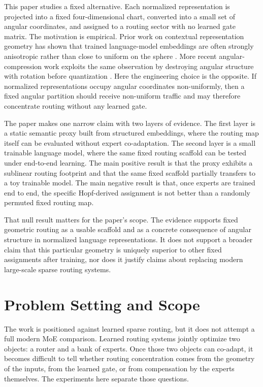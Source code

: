 \documentclass[11pt,letterpaper]{article}
\begin{document}
This paper studies a fixed alternative. Each normalized representation is projected into a fixed four-dimensional chart, converted into a small set of angular coordinates, and assigned to a routing sector with no learned gate matrix. The motivation is empirical. Prior work on contextual representation geometry has shown that trained language-model embeddings are often strongly anisotropic rather than close to uniform on the sphere \citep{ethayarajh2019anisotropy}. More recent angular-compression work exploits the same observation by destroying angular structure with rotation before quantization \citep{turboquant2026}. Here the engineering choice is the opposite. If normalized representations occupy angular coordinates non-uniformly, then a fixed angular partition should receive non-uniform traffic and may therefore concentrate routing without any learned gate.

The paper makes one narrow claim with two layers of evidence. The first layer is a static semantic proxy built from structured embeddings, where the routing map itself can be evaluated without expert co-adaptation. The second layer is a small trainable language model, where the same fixed routing scaffold can be tested under end-to-end learning. The main positive result is that the proxy exhibits a sublinear routing footprint and that the same fixed scaffold partially transfers to a toy trainable model. The main negative result is that, once experts are trained end to end, the specific Hopf-derived assignment is not better than a randomly permuted fixed routing map.

That null result matters for the paper's scope. The evidence supports fixed geometric routing as a usable scaffold and as a concrete consequence of angular structure in normalized language representations. It does not support a broader claim that this particular geometry is uniquely superior to other fixed assignments after training, nor does it justify claims about replacing modern large-scale sparse routing systems.

\section{Problem Setting and Scope}
The work is positioned against learned sparse routing, but it does not attempt a full modern MoE comparison. Learned routing systems jointly optimize two objects: a router and a bank of experts. Once those two objects can co-adapt, it becomes difficult to tell whether routing concentration comes from the geometry of the inputs, from the learned gate, or from compensation by the experts themselves. The experiments here separate those questions.
\end{document}
